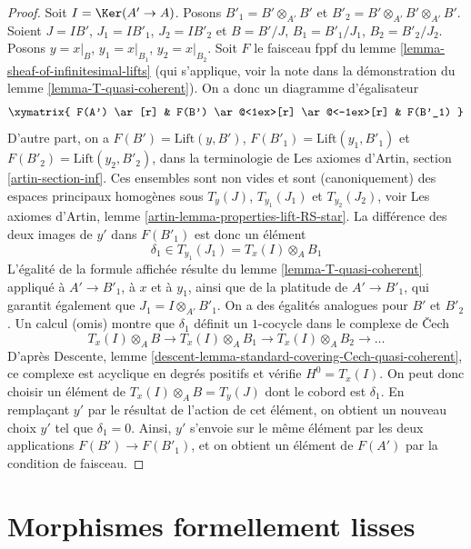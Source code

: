 \begin{proof}
Soit $I = \Ker(A' \to A)$. Posons $B'_1 = B' \otimes_{A'} B'$ et
$B'_2 = B' \otimes_{A'} B' \otimes_{A'} B'$. Soient
$J = IB'$, $J_1 = IB'_1$, $J_2 = IB'_2$ et
$B = B'/J$, $B_1 = B'_1/J_1$, $B_2 = B'_2/J_2$.
Posons $y = x|_B$, $y_1 = x|_{B_1}$, $y_2 = x|_{B_2}$.
Soit $F$ le faisceau fppf du
lemme \ref{lemma-sheaf-of-infinitesimal-lifts}
(qui s'applique, voir la note dans la démonstration du
lemme \ref{lemma-T-quasi-coherent}).
On a donc un diagramme d'égalisateur
$$
\xymatrix{
F(A') \ar[r] &
F(B') \ar@<1ex>[r] \ar@<-1ex>[r] &
F(B'_1)
}
$$
D'autre part, on a $F(B') = \text{Lift}(y, B')$,
$F(B'_1) = \text{Lift}(y_1, B'_1)$ et $F(B'_2) = \text{Lift}(y_2, B'_2)$,
dans la terminologie de Les axiomes d'Artin, section \ref{artin-section-inf}.
Ces ensembles sont non vides et sont (canoniquement) des espaces principaux homogènes sous
$T_y(J)$, $T_{y_1}(J_1)$ et $T_{y_2}(J_2)$, voir
Les axiomes d'Artin, lemme \ref{artin-lemma-properties-lift-RS-star}.
La différence des deux images de $y'$ dans
$F(B'_1)$ est donc un élément
$$
\delta_1 \in T_{y_1}(J_1) = T_x(I) \otimes_A B_1
$$
L'égalité de la formule affichée résulte du
lemme \ref{lemma-T-quasi-coherent} appliqué à
$A' \to B'_1$, à $x$ et à $y_1$, ainsi que de la platitude de $A' \to B'_1$,
qui garantit également que $J_1 = I \otimes_{A'} B'_1$. On a des
égalités analogues pour $B'$ et $B'_2$.
Un calcul (omis) montre que $\delta_1$ définit
un $1$-cocycle dans le complexe de {\v C}ech
$$
T_x(I) \otimes_A B \to
T_x(I) \otimes_A B_1 \to
T_x(I) \otimes_A B_2 \to \ldots
$$
D'après Descente, lemme \ref{descent-lemma-standard-covering-Cech-quasi-coherent},
ce complexe est acyclique en degrés positifs et vérifie $H^0 = T_x(I)$.
On peut donc choisir un élément de $T_x(I) \otimes_A B = T_y(J)$
dont le cobord est $\delta_1$. En remplaçant $y'$ par le résultat
de l'action de cet élément, on obtient un nouveau choix $y'$ tel que $\delta_1 = 0$.
Ainsi, $y'$ s'envoie sur le même élément par les deux applications
$F(B') \to F(B'_1)$, et on obtient un élément de $F(A')$ par
la condition de faisceau.
\end{proof}












\section{Morphismes formellement lisses}
\label{section-formally-smooth}

